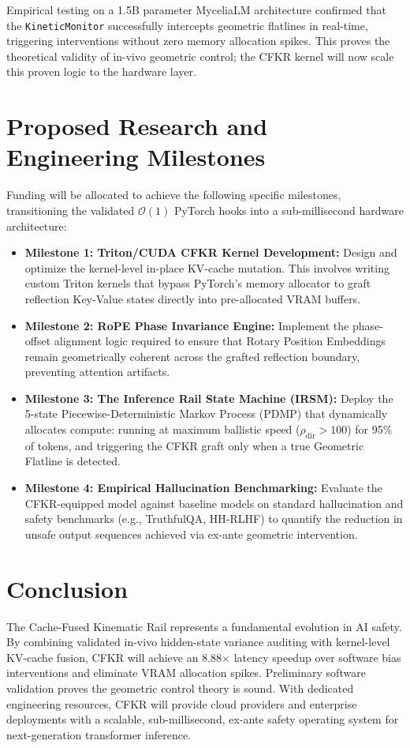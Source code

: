\documentclass[11pt]{article}
\begin{document}
Empirical testing on a 1.5B parameter MyceliaLM architecture confirmed that the \texttt{KineticMonitor} successfully intercepts geometric flatlines in real-time, triggering interventions without zero memory allocation spikes. This proves the theoretical validity of in-vivo geometric control; the CFKR kernel will now scale this proven logic to the hardware layer.

\section{Proposed Research and Engineering Milestones}
Funding will be allocated to achieve the following specific milestones, transitioning the validated $\mathcal{O}(1)$ PyTorch hooks into a sub-millisecond hardware architecture:

\begin{itemize}
    \item \textbf{Milestone 1: Triton/CUDA CFKR Kernel Development:} Design and optimize the kernel-level in-place KV-cache mutation. This involves writing custom Triton kernels that bypass PyTorch's memory allocator to graft reflection Key-Value states directly into pre-allocated VRAM buffers.
    \item \textbf{Milestone 2: RoPE Phase Invariance Engine:} Implement the phase-offset alignment logic required to ensure that Rotary Position Embeddings remain geometrically coherent across the grafted reflection boundary, preventing attention artifacts.
    \item \textbf{Milestone 3: The Inference Rail State Machine (IRSM):} Deploy the 5-state Piecewise-Deterministic Markov Process (PDMP) that dynamically allocates compute: running at maximum ballistic speed ($\rho_{\text{dir}} > 100$) for 95\% of tokens, and triggering the CFKR graft only when a true Geometric Flatline is detected.
    \item \textbf{Milestone 4: Empirical Hallucination Benchmarking:} Evaluate the CFKR-equipped model against baseline models on standard hallucination and safety benchmarks (e.g., TruthfulQA, HH-RLHF) to quantify the reduction in unsafe output sequences achieved via ex-ante geometric intervention.
\end{itemize}

\section{Conclusion}
The Cache-Fused Kinematic Rail represents a fundamental evolution in AI safety. By combining validated in-vivo hidden-state variance auditing with kernel-level KV-cache fusion, CFKR will achieve an 8.88$\times$ latency speedup over software bias interventions and eliminate VRAM allocation spikes. Preliminary software validation proves the geometric control theory is sound. With dedicated engineering resources, CFKR will provide cloud providers and enterprise deployments with a scalable, sub-millisecond, ex-ante safety operating system for next-generation transformer inference.
\end{document}

